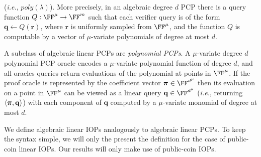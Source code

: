  (\emph{i.e.}, $poly(\lambda)$). More precisely, in an algebraic degree $d$ PCP there is a query function $Q: \FF^\mu \rightarrow \FF^m$ such that each verifier query is of the form $\mathbf{q} \leftarrow Q(\mathbf{r})$, where $\mathbf{r}$ is uniformly sampled from $\FF^\mu$, and the function $Q$ is computable by a vector of $\mu$-variate polynomials of degree at most $d$. 

A subclass of algebraic linear PCPs are \emph{polynomial PCPs}. A $\mu$-variate degree $d$ polynomial PCP oracle encodes a $\mu$-variate polynomial function of degree $d$, and all oracles queries return evaluations of the polynomial at points in $\FF^\mu$. If the proof oracle is represented by the coefficient vector $\proofO \in \FF^{d^\mu}$ then its evaluation on a point in $\FF^\mu$ can be viewed as a linear query $\mathbf{q} \in \FF^{d^\mu}$ (\emph{i.e.}, returning $\langle \boldsymbol{\pi}, \mathbf{q} \rangle$) with each component of $\mathbf{q}$ computed by a $\mu$-variate monomial of degree at most $d$. 

We define algebraic linear IOPs analogously to algebraic linear PCPs. To keep the syntax simple, we will only the present the definition for the case of public-coin linear IOPs. Our results will only make use of public-coin IOPs. 

